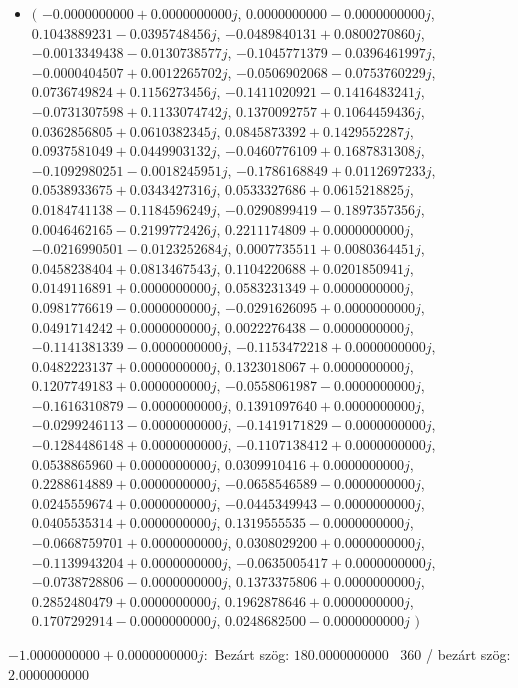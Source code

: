 \documentclass[14pt,a4paper]{article}
\begin{document}
\begin{itemize}
\item
$\big($
$-0.0000000000+0.0000000000j$, $0.0000000000-0.0000000000j$, $0.1043889231-0.0395748456j$, $-0.0489840131+0.0800270860j$, $-0.0013349438-0.0130738577j$, $-0.1045771379-0.0396461997j$, $-0.0000404507+0.0012265702j$, $-0.0506902068-0.0753760229j$, $0.0736749824+0.1156273456j$, $-0.1411020921-0.1416483241j$, $-0.0731307598+0.1133074742j$, $0.1370092757+0.1064459436j$, $0.0362856805+0.0610382345j$, $0.0845873392+0.1429552287j$, $0.0937581049+0.0449903132j$, $-0.0460776109+0.1687831308j$, $-0.1092980251-0.0018245951j$, $-0.1786168849+0.0112697233j$, $0.0538933675+0.0343427316j$, $0.0533327686+0.0615218825j$, $0.0184741138-0.1184596249j$, $-0.0290899419-0.1897357356j$, $0.0046462165-0.2199772426j$, $0.2211174809+0.0000000000j$, $-0.0216990501-0.0123252684j$, $0.0007735511+0.0080364451j$, $0.0458238404+0.0813467543j$, $0.1104220688+0.0201850941j$, $0.0149116891+0.0000000000j$, $0.0583231349+0.0000000000j$, $0.0981776619-0.0000000000j$, $-0.0291626095+0.0000000000j$, $0.0491714242+0.0000000000j$, $0.0022276438-0.0000000000j$, $-0.1141381339-0.0000000000j$, $-0.1153472218+0.0000000000j$, $0.0482223137+0.0000000000j$, $0.1323018067+0.0000000000j$, $0.1207749183+0.0000000000j$, $-0.0558061987-0.0000000000j$, $-0.1616310879-0.0000000000j$, $0.1391097640+0.0000000000j$, $-0.0299246113-0.0000000000j$, $-0.1419171829-0.0000000000j$, $-0.1284486148+0.0000000000j$, $-0.1107138412+0.0000000000j$, $0.0538865960+0.0000000000j$, $0.0309910416+0.0000000000j$, $0.2288614889+0.0000000000j$, $-0.0658546589-0.0000000000j$, $0.0245559674+0.0000000000j$, $-0.0445349943-0.0000000000j$, $0.0405535314+0.0000000000j$, $0.1319555535-0.0000000000j$, $-0.0668759701+0.0000000000j$, $0.0308029200+0.0000000000j$, $-0.1139943204+0.0000000000j$, $-0.0635005417+0.0000000000j$, $-0.0738728806-0.0000000000j$, $0.1373375806+0.0000000000j$, $0.2852480479+0.0000000000j$, $0.1962878646+0.0000000000j$, $0.1707292914-0.0000000000j$, $0.0248682500-0.0000000000j$
$\big)$
\end{itemize}
$-1.0000000000+0.0000000000j$:\
Bezárt szög: $180.0000000000$ \
360 / bezárt szög: $2.0000000000$\
\end{document}
